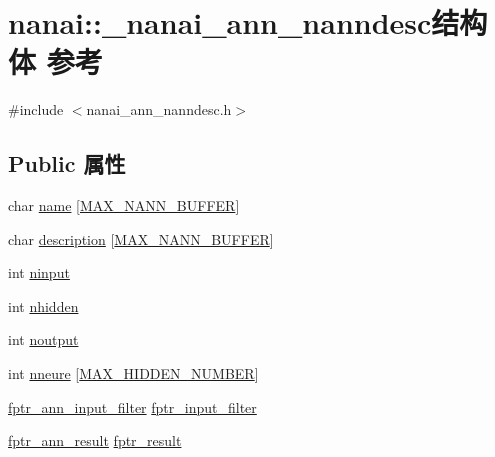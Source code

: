 \hypertarget{structnanai_1_1__nanai__ann__nanndesc}{}\section{nanai\+:\+:\+\_\+nanai\+\_\+ann\+\_\+nanndesc结构体 参考}
\label{structnanai_1_1__nanai__ann__nanndesc}


{\ttfamily \#include $<$nanai\+\_\+ann\+\_\+nanndesc.\+h$>$}

\subsection*{Public 属性}
\begin{DoxyCompactItemize}
\item 
char \hyperlink{structnanai_1_1__nanai__ann__nanndesc_acb2c1033bc070b8e54407420cd55540d}{name} \mbox{[}\hyperlink{nanai__ann__nanndesc_8h_a4ca8d25c309ec7a3f823bfb552d84498}{M\+A\+X\+\_\+\+N\+A\+N\+N\+\_\+\+B\+U\+F\+F\+E\+R}\mbox{]}
\item 
char \hyperlink{structnanai_1_1__nanai__ann__nanndesc_ad60d6c9ce5e8e963919f7e99e1a42f96}{description} \mbox{[}\hyperlink{nanai__ann__nanndesc_8h_a4ca8d25c309ec7a3f823bfb552d84498}{M\+A\+X\+\_\+\+N\+A\+N\+N\+\_\+\+B\+U\+F\+F\+E\+R}\mbox{]}
\item 
int \hyperlink{structnanai_1_1__nanai__ann__nanndesc_a71bf45651c89fa76315269228729d929}{ninput}
\item 
int \hyperlink{structnanai_1_1__nanai__ann__nanndesc_a3921a627a9ddf822036bcaed9d0bf1b5}{nhidden}
\item 
int \hyperlink{structnanai_1_1__nanai__ann__nanndesc_a769462fc48b0adcf72ee32c9f8026735}{noutput}
\item 
int \hyperlink{structnanai_1_1__nanai__ann__nanndesc_a62b3366bcb4042255717c4cfb6b604c4}{nneure} \mbox{[}\hyperlink{nanai__ann__nanndesc_8h_a6e62108830287144c83d4681c2d59381}{M\+A\+X\+\_\+\+H\+I\+D\+D\+E\+N\+\_\+\+N\+U\+M\+B\+E\+R}\mbox{]}
\item 
\hyperlink{namespacenanai_a681d28f80aa95597ffc268b3b01abcfc}{fptr\+\_\+ann\+\_\+input\+\_\+filter} \hyperlink{structnanai_1_1__nanai__ann__nanndesc_ae64c57e68db6cb6e90dc059c8fca7f4a}{fptr\+\_\+input\+\_\+filter}
\item 
\hyperlink{namespacenanai_ab737ac3c4f32f96a8ee6400db1c5a90f}{fptr\+\_\+ann\+\_\+result} \hyperlink{structnanai_1_1__nanai__ann__nanndesc_a7a04fc59e4fa9e74a595bec378c8226b}{fptr\+\_\+result}
\item 

\end{DoxyCompactItemize}
